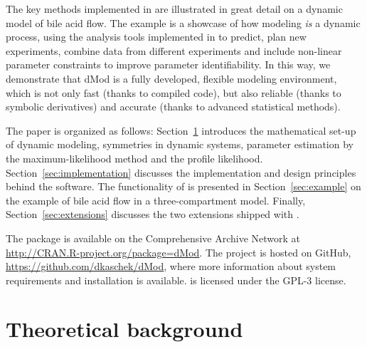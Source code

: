\documentclass[article]{jss}
\begin{document}
The key methods implemented in  are illustrated in great detail on a dynamic model of bile acid flow. The example is a showcase of how modeling \textit{is} a dynamic process, using the analysis tools implemented in  to predict, plan new experiments, combine data from different experiments and include non-linear parameter constraints to improve parameter identifiability. In this way, we demonstrate that dMod is a fully developed, flexible modeling environment, which is not only fast (thanks to compiled code), but also reliable (thanks to symbolic derivatives) and accurate (thanks to advanced statistical methods). 

The paper is organized as follows: Section~\ref{sec:theory} introduces the mathematical set-up of dynamic modeling, symmetries in dynamic systems, parameter estimation by the maximum-likelihood method and the profile likelihood. Section~\ref{sec:implementation} discusses the implementation and design principles behind the  software. The functionality of  is presented in Section~\ref{sec:example} on the example of bile acid flow in a three-compartment model. Finally, Section~\ref{sec:extensions} discusses the two  extensions shipped with .

The  package is available on the Comprehensive  Archive Network at \url{http://CRAN.R-project.org/package=dMod}. The project is hosted on GitHub, \url{https://github.com/dkaschek/dMod}, where more information about system requirements and installation is available.  is licensed under the GPL-3 license. 




\section{Theoretical background}
\label{sec:theory}
\end{document}
